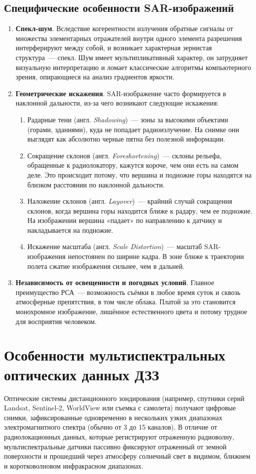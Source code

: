 \subsection{Специфические особенности SAR-изображений}
\begin{enumerate}[label*=\arabic*.]
    \item \textbf{Спекл-шум}. Вследствие когерентности излучения обратные сигналы от множества элементарных отражателей внутри одного элемента разрешения интерферируют между собой, и возникает характерная зернистая структура~--- спекл. Шум имеет мультипликативный характер, он затрудняет визуальную интерпретацию и ломает классические алгоритмы компьютерного зрения, опирающиеся на анализ градиентов яркости.
    \item \textbf{Геометрические искажения}. SAR-изображение часто формируется в наклонной дальности, из-за чего возникают следующие искажения:
    \begin{enumerate}[label*=\arabic*.]
        \item Радарные тени (англ. \textit{Shadowing})~--- зоны за высокими объектами (горами, зданиями), куда не попадает радиоизлучение. На снимке они выглядят как абсолютно черные пятна без полезной информации.
        \item Сокращение склонов (англ. \textit{Foreshortening})~--- склоны рельефа, обращенные к радиолокатору, кажутся короче, чем они есть на самом деле. Это происходит потому, что вершина и подножие горы находятся на близком расстоянии по наклонной дальности.
        \item Наложение склонов (англ. \textit{Layover})~--- крайний случай сокращения склонов, когда вершина горы находится ближе к радару, чем ее подножие. На изображении вершина «падает» по направлению к датчику и накладывается на подножие.
        \item Искажение масштаба (англ. \textit{Scale Distortion})~--- масштаб SAR-изображения непостоянен по ширине кадра. В зоне ближе к траектории полета сжатие изображения сильнее, чем в дальней.
    \end{enumerate}
    \item \textbf{Независимость от освещенности и погодных условий}. Главное преимущество РСА~--- возможность съёмки в любое время суток и сквозь атмосферные препятствия, в том числе облака. Платой за это становится монохромное изображение, лишённое естественного цвета и потому трудное для восприятия человеком.
\end{enumerate}

\section{Особенности мультиспектральных оптических данных ДЗЗ}
Оптические системы дистанционного зондирования (например, спутники серий Landsat, Sentinel-2, WorldView или съемка с самолета) получают цифровые снимки, зафиксированные одновременно в нескольких узких диапазонах электромагнитного спектра (обычно от 3 до 15 каналов).
В отличие от радиолокационных данных, которые регистрируют отраженную радиоволну, мультиспектральные датчики пассивно фиксируют отраженный от земной поверхности и прошедший через атмосферу солнечный свет в видимом, ближнем и коротковолновом инфракрасном диапазонах.

